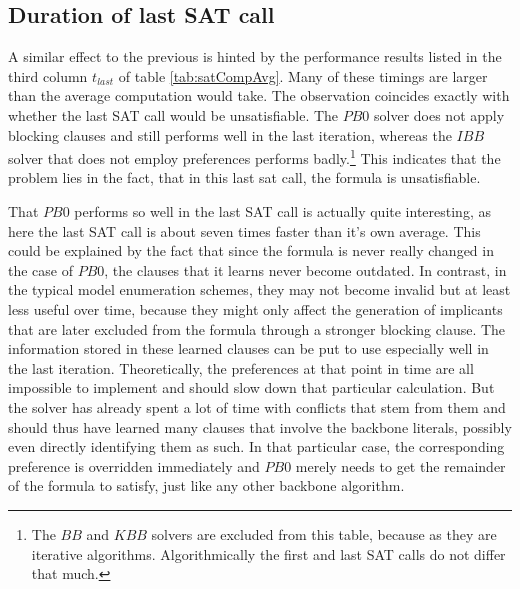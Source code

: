 



\subsection{Duration of last SAT call}
\label{ss:durLastCall}
A similar effect to the previous is hinted by the performance results listed in the third column $t_{last}$ of table \ref{tab:satCompAvg}. Many of these timings are larger than the average computation would take. The observation coincides exactly with whether the last SAT call would be unsatisfiable. The $PB0$ solver does not apply blocking clauses and still performs well in the last iteration, whereas the $IBB$ solver that does not employ preferences performs badly.\footnote{The $BB$ and $KBB$ solvers are excluded from this table, because as they are iterative algorithms. Algorithmically the first and last SAT calls do not differ that much.} This indicates that the problem lies in the fact, that in this last sat call, the formula is unsatisfiable.

That $PB0$ performs so well in the last SAT call is actually quite interesting, as here the last SAT call is about seven times faster than it's own average. This could be explained by the fact that since the formula is never really changed in the case of $PB0$, the clauses that it learns never become outdated. In contrast, in the typical model enumeration schemes, they may not become invalid but at least less useful over time, because they might only affect the generation of implicants that are later excluded from the formula through a stronger blocking clause. The information stored in these learned clauses can be put to use especially well in the last iteration. Theoretically, the preferences at that point in time are all impossible to implement and should slow down that particular calculation. 
But the solver has already spent a lot of time with conflicts that stem from them and should thus have learned many clauses that involve the backbone literals, possibly even directly identifying them as such. In that particular case, the corresponding preference is overridden immediately and $PB0$ merely needs to get the remainder of the formula to satisfy, just like any other backbone algorithm.


